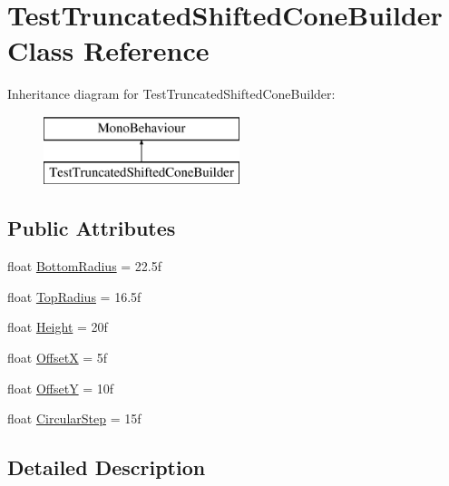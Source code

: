 \hypertarget{class_test_truncated_shifted_cone_builder}{}\section{Test\+Truncated\+Shifted\+Cone\+Builder Class Reference}
\label{class_test_truncated_shifted_cone_builder}
Inheritance diagram for Test\+Truncated\+Shifted\+Cone\+Builder\+:\begin{figure}[H]
\begin{center}
\leavevmode
\includegraphics[height=2.000000cm]{class_test_truncated_shifted_cone_builder}
\end{center}
\end{figure}
\subsection*{Public Attributes}
\begin{DoxyCompactItemize}
\item 
float \mbox{\hyperlink{class_test_truncated_shifted_cone_builder_ad171df93b77b2ecb5660c641f62228e5}{Bottom\+Radius}} = 22.\+5f
\item 
float \mbox{\hyperlink{class_test_truncated_shifted_cone_builder_a709530aa60aebe3a91631cfa70ad4519}{Top\+Radius}} = 16.\+5f
\item 
float \mbox{\hyperlink{class_test_truncated_shifted_cone_builder_a0cef8a4bbaed1a5add60452d7a3e645e}{Height}} = 20f
\item 
float \mbox{\hyperlink{class_test_truncated_shifted_cone_builder_a4120d5f26a5b334544ab422c17b0088c}{OffsetX}} = 5f
\item 
float \mbox{\hyperlink{class_test_truncated_shifted_cone_builder_aec0ce8360ff6d59808f24b0a9f08c970}{OffsetY}} = 10f
\item 
float \mbox{\hyperlink{class_test_truncated_shifted_cone_builder_a210744bb0692019895c033c696c47ae7}{Circular\+Step}} = 15f
\end{DoxyCompactItemize}


\subsection{Detailed Description}


